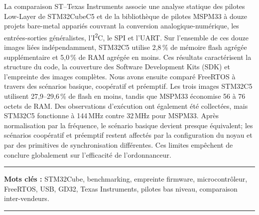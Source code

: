 La comparaison ST--Texas Instruments associe une analyse statique des pilotes Low-Layer de
STM32CubeC5 et de la bibliothèque de pilotes MSPM33 à douze projets bare-metal appariés
couvrant la conversion analogique-numérique, les entrées-sorties généralistes,
l'I\textsuperscript{2}C, le SPI et l'UART. Sur l'ensemble de ces douze images liées
indépendamment, STM32C5 utilise 2,8\,\% de mémoire flash agrégée supplémentaire et 5,0\,\% de
RAM agrégée en moins. Ces résultats caractérisent la structure du code, la couverture des
Software Development Kits (SDK) et l'empreinte des images complètes. Nous avons ensuite
comparé FreeRTOS à travers des scénarios basique, coopératif et préemptif. Les trois images
STM32C5 utilisent 27,9--29,6\,\% de flash en moins, tandis que MSPM33 économise 56 à 76
octets de RAM. Des observations d'exécution ont également été collectées, mais STM32C5
fonctionne à 144\,MHz contre 32\,MHz pour MSPM33. Après normalisation par la fréquence, le
scénario basique devient presque équivalent; les scénarios coopératif et préemptif restent
affectés par la configuration du noyau et par des primitives de synchronisation différentes.
Ces limites empêchent de conclure globalement sur l'efficacité de l'ordonnanceur.

\noindent\rule[2pt]{\textwidth}{0.5pt}

{\textbf{Mots clés :}}
STM32Cube, benchmarking, empreinte firmware, microcontrôleur, FreeRTOS, USB, GD32, Texas Instruments, pilotes bas niveau, comparaison inter-vendeurs.
\\
\noindent\rule[2pt]{\textwidth}{0.5pt}